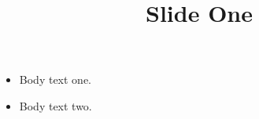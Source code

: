 \documentclass[11pt,a4paper]{article}
\title{Slide One}
\begin{document}
\maketitle

\begin{itemize}
\item Body text one.
\end{itemize}

\begin{itemize}
\item Body text two.
\end{itemize}
\end{document}
